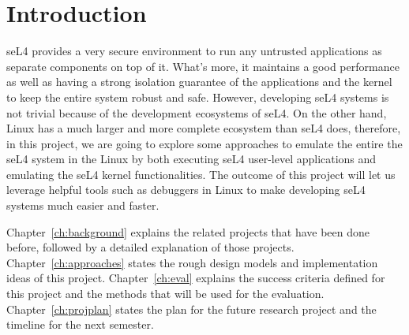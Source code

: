 \chapter{Introduction}\label{ch:intro}

seL4 provides a very secure environment to run any untrusted applications as separate components on top of it. What's more, it maintains a good performance as well as having a strong isolation guarantee of the applications and the kernel to keep the entire system robust and safe. However, developing seL4 systems is not trivial because of the development ecosystems of seL4. On the other hand, Linux has a much larger and more complete ecosystem than seL4 does, therefore, in this project, we are going to explore some approaches to emulate the entire the seL4 system in the Linux by both executing seL4 user-level applications and emulating the seL4 kernel functionalities. The outcome of this project will let us leverage helpful tools such as debuggers in Linux to make developing seL4 systems much easier and faster.

Chapter~\ref{ch:background} explains the related projects that have been done before, followed by a detailed explanation of those projects.
Chapter~\ref{ch:approaches} states the rough design models and implementation ideas of this project.
Chapter~\ref{ch:eval} explains the success criteria defined for this project and the methods that will be used for the evaluation.
Chapter~\ref{ch:projplan} states the plan for the future research project and the timeline for the next semester.